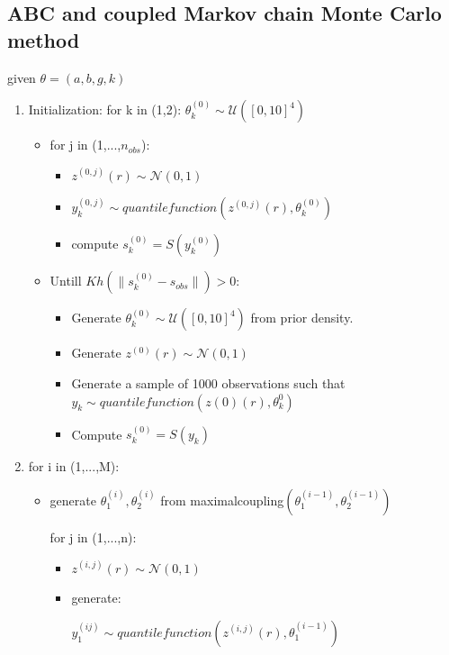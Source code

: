 \documentclass[11pt,a4paper,oneside]{report}
\begin{document}
\subsection{ABC and coupled Markov chain Monte Carlo method}
given $\theta =( a,b,g,k )$
\begin{enumerate}

\item Initialization:
for k in (1,2):
$ \theta_{k}^{(0)} \sim \mathcal{U}([0,10]^4)$ 

\begin{itemize}
\item for j in (1,...,$n_{obs}$):
\begin{itemize}
	\item $z^{(0,j)}(r) \sim \mathcal{N}(0,1)  $
	
	\item $ y_{k}^{(0,j)} \sim quantilefunction(z^{(0,j)}(r),\theta_{k}^{(0)})$
	
	\item compute $ s_{k}^{(0)} =S(y_{k}^{(0)})$
\end{itemize}

\item Untill $Kh(\|s_{k}^{(0)} - s_{obs}\|)>0$:
\begin{itemize}
	\item Generate $\theta_{k}^{(0)} \sim \mathcal{U}([0,10]^4)$ from prior density.
	\item Generate $z^{(0)}(r) \sim \mathcal{N}(0,1)$
	\item Generate a sample of 1000 observations such that $y_{k} \sim quantile function(z{(0)}(r),\theta_{k}^{0})$
	\item Compute $s_{k}^{(0)}=S(y_{k})$
	
\end{itemize}
\end{itemize}


\item for i in (1,...,M):
\begin{itemize}
	\item 	generate $\theta_{1}^{(i)},\theta_{2}^{(i)}$  from maximalcoupling$(\theta_{1}^{(i-1)},\theta_{2}^{(i-1)})$
	
		
	for j in (1,...,n):
	\begin{itemize}
		\item $z^{(i,j)}(r) \sim \mathcal{N}(0,1)$
		\item generate:
		
		$ y_{1}^{(ij)} \sim quantile function(z^{(i,j)}(r), \theta_{1}^{(i-1)})$
		

\end{itemize}
\end{itemize}
\end{enumerate}
\end{document}
